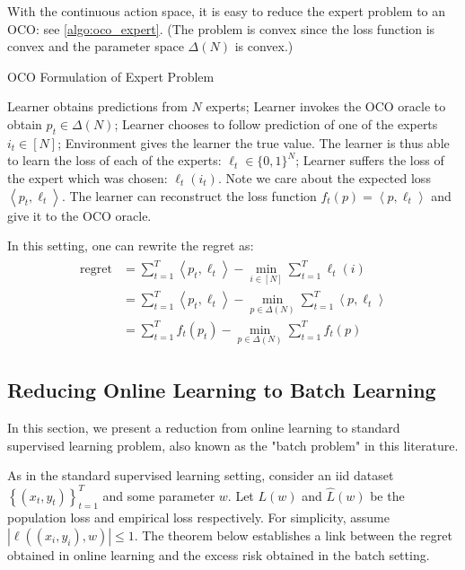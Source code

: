 \documentclass{article}
\newcommand{\re}{\operatorname{regret}}
\begin{document}
With the continuous action space, it is easy to reduce the expert problem to an OCO: see \cref{algo:oco_expert}. (The problem is convex since the loss function is convex and the parameter space $\Delta(N)$ is convex.)
\begin{algorithm}[H]
    \caption{OCO Formulation of Expert Problem}\label{algo:oco_expert}
    \begin{algorithmic}[1]
                \STATE  Learner obtains predictions from $N$ experts;
                \STATE Learner invokes the OCO oracle to obtain $p_{t} \in \Delta(N)$;
                \STATE Learner chooses to follow prediction of one of the experts $i_{t} \in[N]$;
                \STATE Environment gives the learner the true value. The learner is thus able to learn the loss of each of the experts: $\ell_{t} \in\{0,1\}^{N}$;
                \STATE Learner suffers the loss of the expert which was chosen: $\ell_{t}\left(i_{t}\right) .$ Note we care about the expected loss $\left\langle p_t, \ell_{t}\right\rangle$. The learner can reconstruct the loss function $f_{t}(p)=\left\langle p, \ell_{t}\right\rangle$ and give it to the OCO oracle.
        \ENDFOR
    \end{algorithmic}
\end{algorithm}
In this setting, one can rewrite the regret as:
\begin{align*}
\begin{aligned}
\re &=\sum_{t=1}^{T}\left\langle p_{t}, \ell_{t}\right\rangle-\min _{i \in[N]} \sum_{t=1}^{T} \ell_{t}(i) \\
&=\sum_{t=1}^{T}\left\langle p_{t}, \ell_{t}\right\rangle-\min _{p \in \Delta(N)} \sum_{t=1}^{T}\left\langle p, \ell_{t}\right\rangle \\
&=\sum_{t=1}^{T} f_{t}\left(p_{t}\right)-\min _{p \in \Delta(N)} \sum_{t=1}^{T} f_{t}(p)
\end{aligned}
\end{align*}

\subsection{Reducing Online Learning to Batch Learning}
In this section, we present a reduction from online learning to standard supervised learning problem, also known as the "batch problem" in this literature.

As in the standard supervised learning setting, consider an \gls{iid} dataset $\left\{\left(x_{t}, y_{t}\right)\right\}_{t=1}^{T}$ and some parameter $w$. Let $L(w)$ and $\widehat{L}(w)$ be the population loss and empirical loss respectively. For simplicity, assume $\left|\ell\left(\left(x_{i}, y_{i}\right), w\right)\right| \leq 1$. The theorem below establishes a link between the regret obtained in online learning and the excess risk obtained in the batch setting.
\end{document}
